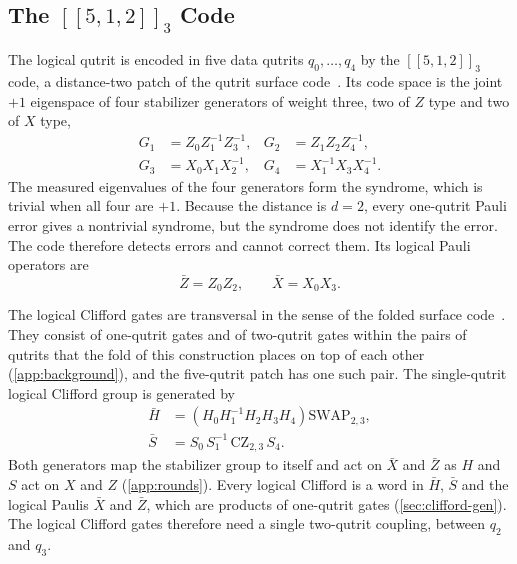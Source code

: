\subsection{The \texorpdfstring{$[[5,1,2]]_3$}{[[5,1,2]]3} Code}
\label{sub:code}\label{sec: error detection code}

The logical qutrit is encoded in five data qutrits $q_0, \dots, q_4$ by the $[[5,1,2]]_3$ code, a distance-two patch of the qutrit surface code~\cite{Moussa2016}. Its code space is the joint $+1$ eigenspace of four stabilizer generators of weight three, two of $Z$ type and two of $X$ type,
\begin{align}
  G_1 &= Z_0 Z_1^{-1} Z_3^{-1}, & G_2 &= Z_1 Z_2 Z_4^{-1}, \label{eq:s1}\\
  G_3 &= X_0 X_1 X_2^{-1}, & G_4 &= X_1^{-1} X_3 X_4^{-1} .
  \label{eq:s4}
\end{align}
The measured eigenvalues of the four generators form the syndrome, which is trivial when all four are $+1$. Because the distance is $d = 2$, every one-qutrit Pauli error gives a nontrivial syndrome, but the syndrome does not identify the error. The code therefore detects errors and cannot correct them. Its logical Pauli operators are
\begin{equation}
  \bar Z = Z_0 Z_2, \qquad
  \bar X = X_0 X_3 .
  \label{eq:logicalPauli}
\end{equation}

The logical Clifford gates are transversal in the sense of the folded surface code~\cite{Moussa2016}. They consist of one-qutrit gates and of two-qutrit gates within the pairs of qutrits that the fold of this construction places on top of each other (\autoref{app:background}), and the five-qutrit patch has one such pair. The single-qutrit logical Clifford group is generated by
\begin{align}
  \bar H &=
  \left( H_0 H_1^{-1} H_2 H_3 H_4 \right) \mathrm{SWAP}_{2,3}, \label{eq:logical_H}\\
  \bar S &= S_0\, S_1^{-1}\, \mathrm{CZ}_{2,3}\, S_4 .
  \label{eq:logical_HS}
\end{align}
Both generators map the stabilizer group to itself and act on $\bar X$ and $\bar Z$ as $H$ and $S$ act on $X$ and $Z$ (\autoref{app:rounds}). Every logical Clifford is a word in $\bar H$, $\bar S$ and the logical Paulis $\bar X$ and $\bar Z$, which are products of one-qutrit gates (\autoref{sec:clifford-gen}). The logical Clifford gates therefore need a single two-qutrit coupling, between $q_2$ and $q_3$.

